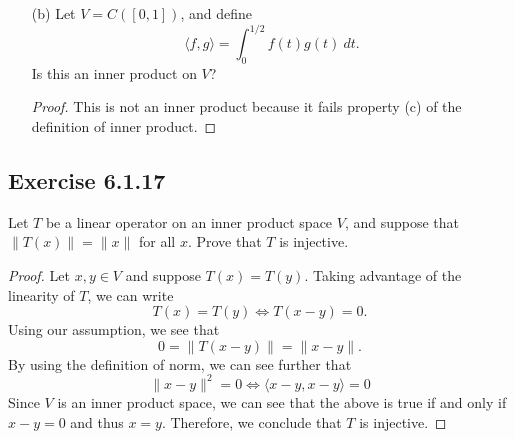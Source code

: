 \begin{enumerate}
\begin{proof}
\begin{enumerate}
\begin{align*}
                    \overline{\langle f , g \rangle} &= \frac{ 1 }{ 2 \pi  } \overline{\int_{ 0 }^{ 2 \pi } f(t) g(t)  \ dt } \\
                                                     &= \frac{ 1  }{ 2 \pi }  \int_{ 0 }^{ 2 \pi }  \overline{f(t) \overline{g(t)}} \ dt \\
                                                     &= \frac{ 1 }{ 2 \pi }  \int_{ 0 }^{ 2 \pi }  \overline{f(t)} g(t) \ dt \tag{\(  \overline{\overline{g(t)}} = g(t)\)} \\
                                                     &= \frac{ 1 }{ 2 \pi }  \int_{ 0 }^{ 2 \pi } g(t) \overline{f(t)}  \ dt  \\
                                                     &= \frac{ 1 }{ 2 \pi }  \int_{ 0 }^{ 2 \pi }  \overline{f(t)} g(t) \ dt \\
                                                     &= \langle g , f \rangle.
                \end{align*}
            \item[(d)] For \( f > 0  \), we know that \( \int_{ 0 }^{ 2 \pi  } f  \ dt > 0  \) by our integration properties. Thus, we have
                \begin{align*}
                    \langle f , f \rangle &= \frac{ 1  }{ 2 \pi } \int_{ 0  }^{ 2 \pi }  f(t) \overline{f(t)} \ dt > 0. 
                \end{align*}
        \end{enumerate} 
    We conclude that \( \langle \cdot  ,  \cdot  \rangle \) satisfies all properties of an inner product.
        \end{proof}
    \item[(b)] Let \( V = C([0,1]) \), and define 
        \[  \langle f , g \rangle = \int_{ 0 }^{ 1 / 2  }  f(t) g(t)  \ dt. \]
        Is this an inner product on \( V  \)?
        \begin{proof}
        This is not an inner product because it fails property (c) of the definition of inner product.
        \end{proof}
\end{enumerate}

\subsection*{Exercise 6.1.17} Let \( T  \) be a linear operator on an inner product space \( V  \), and suppose that \( \|T(x)\| = \|x \|  \) for all \( x  \). Prove that \( T  \) is injective.
\begin{proof}
Let \( x,y \in V  \) and suppose \( T(x) = T(y) \). Taking advantage of the linearity of \( T  \), we can write 
\[  T(x) = T(y) \iff T(x - y) = 0.  \]
Using our assumption, we see that
\[ 0 = \|T(x-y)\| = \|x-y\|.  \]
By using the definition of norm, we can see further that
\[  \| x - y \|^{2} = 0 \iff \langle x - y  ,  x - y  \rangle = 0   \]
Since \( V  \) is an inner product space, we can see that the above is true if and only if \( x - y = 0  \) and thus \( x = y  \). Therefore, we conclude that \( T  \) is injective.
\end{proof}

